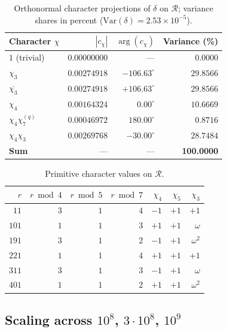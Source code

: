 \documentclass[11pt,a4paper]{article}
\newcommand{\R}{\mathcal{R}}
\newcommand{\Var}{\mathrm{Var}}
\begin{document}
\begin{table}[ht]
\centering
\caption{Orthonormal character projections of $\delta$ on $\R$;
variance shares in percent ($\Var(\delta)=2.53\times 10^{-5}$).}
\label{tab:projections}
\begin{tabular}{lrrr}
\toprule
Character $\chi$ & $|c_\chi|$ & $\arg(c_\chi)$ & Variance (\%) \\
\midrule
$1$ (trivial) & $0.00000000$ & --- & $0.0000$ \\
$\chi_3$ & $0.00274918$ & $-106.63^\circ$ & $29.8566$ \\
$\overline{\chi_3}$ & $0.00274918$ & $+106.63^\circ$ & $29.8566$ \\
$\chi_4$ & $0.00164324$ & $0.00^\circ$ & $10.6669$ \\
$\chi_4\chi_7^{(q)}$ & $0.00046972$ & $180.00^\circ$ & $0.8716$ \\
$\chi_4\chi_3$ & $0.00269768$ & $-30.00^\circ$ & $28.7484$ \\
\midrule
\textbf{Sum} & --- & --- & \textbf{100.0000} \\
\bottomrule
\end{tabular}
\end{table}

\begin{table}[ht]
\centering
\caption{Primitive character values on $\R$.}
\label{tab:char-values}
\begin{tabular}{rrrrrrr}
\toprule
$r$ & $r\bmod 4$ & $r\bmod 5$ & $r\bmod 7$ & $\chi_4$ & $\chi_5$ & $\chi_3$ \\
\midrule
$11$  & $3$ & $1$ & $4$ & $-1$ & $+1$ & $+1$ \\
$101$ & $1$ & $1$ & $3$ & $+1$ & $+1$ & $\omega$ \\
$191$ & $3$ & $1$ & $2$ & $-1$ & $+1$ & $\omega^2$ \\
$221$ & $1$ & $1$ & $4$ & $+1$ & $+1$ & $+1$ \\
$311$ & $3$ & $1$ & $3$ & $-1$ & $+1$ & $\omega$ \\
$401$ & $1$ & $1$ & $2$ & $+1$ & $+1$ & $\omega^2$ \\
\bottomrule
\end{tabular}
\end{table}

\subsection{Scaling across $10^8$, $3\cdot 10^8$, $10^9$}
\end{document}
